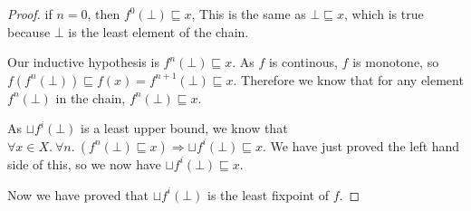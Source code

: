\begin{proof}
if $n = 0$, then $f^0(\bot) \sqsubseteq x$, This is the same as $\bot \sqsubseteq x$, which is true because $\bot$ is the least element of the chain.

Our inductive hypothesis is $f^n(\bot) \sqsubseteq x$. As $f$ is continous, $f$ is monotone, so $f(f^n(\bot)) \sqsubseteq f(x) = f^{n+1}(\bot) \sqsubseteq x$. Therefore we know that for any element $f^n(\bot)$ in the chain, $f^n(\bot) \sqsubseteq x$. 

As $\sqcup f^i (\bot)$ is a least upper bound, we know that  $\forall x \in X. \  \forall n. \ (f^n(\bot) \sqsubseteq x) \Rightarrow \sqcup f^i (\bot) \sqsubseteq x$. We have just proved the left hand side of this, so we now have $\sqcup f^i (\bot) \sqsubseteq x$.

\vspace{0.5cm}

Now we have proved that $\sqcup f^i (\bot)$ is the least fixpoint of $f$.
\end{proof}